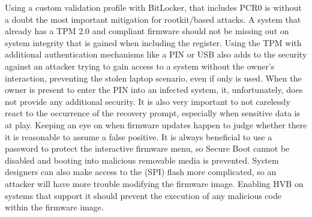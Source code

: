 Using a custom validation profile with BitLocker, that includes \ac{PCR}0 is without a doubt the most important mitigation for rootkit\-/based attacks.
A system that already has a \ac{TPM} 2.0 and compliant firmware should not be missing out on system integrity that is gained when including the register.
Using the \ac{TPM} with additional authentication mechanisms like a \ac{PIN} or \ac{USB} also adds to the security against an attacker trying to gain access to a system without the owner's interaction, preventing the stolen laptop scenario, even if only \hyperref[tab:pcr-usage]{} is used.
When the owner is present to enter the \ac{PIN} into an infected system, it, unfortunately, does not provide any additional security.
It is also very important to not carelessly react to the occurrence of the recovery prompt, especially when sensitive data is at play.
Keeping an eye on when firmware updates happen to judge whether there it is reasonable to assume a false positive.
It is always beneficial to use a password to protect the interactive firmware menu, so Secure Boot cannot be disabled and booting into malicious removable media is prevented.
System designers can also make access to the (\ac{SPI}) flash more complicated, so an attacker will have more trouble modifying the firmware image.
Enabling \ac{HVB} on systems that support it should prevent the execution of any malicious code within the firmware image.